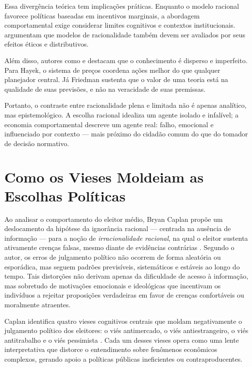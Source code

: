 Essa divergência teórica tem implicações práticas. Enquanto o modelo racional favorece políticas baseadas em incentivos marginais, a abordagem comportamental exige considerar limites cognitivos e contextos institucionais.  argumentam que modelos de racionalidade também devem ser avaliados por seus efeitos éticos e distributivos.

Além disso, autores como  e  destacam que o conhecimento é disperso e imperfeito. Para Hayek, o sistema de preços coordena ações melhor do que qualquer planejador central. Já Friedman sustenta que o valor de uma teoria está na qualidade de suas previsões, e não na veracidade de suas premissas.

Portanto, o contraste entre racionalidade plena e limitada não é apenas analítico, mas epistemológico. A escolha racional idealiza um agente isolado e infalível; a economia comportamental descreve um agente real: falho, emocional e influenciado por contexto — mais próximo do cidadão comum do que do tomador de decisão normativo.

\section{Como os Vieses Moldeiam as Escolhas Políticas} %


Ao analisar o comportamento do eleitor médio, Bryan Caplan propõe um deslocamento da hipótese da ignorância racional — centrada na ausência de informação — para a noção de \textit{irracionalidade racional}, na qual o eleitor sustenta ativamente crenças falsas, mesmo diante de evidências contrárias \cite{The_Myth_of_the_Rational_Voter}. Segundo o autor, os erros de julgamento político não ocorrem de forma aleatória ou esporádica, mas seguem padrões previsíveis, sistemáticos e estáveis ao longo do tempo. Tais distorções não derivam apenas da dificuldade de acesso à informação, mas sobretudo de motivações emocionais e ideológicas que incentivam os indivíduos a rejeitar proposições verdadeiras em favor de crenças confortáveis ou moralmente atraentes.

Caplan identifica quatro vieses cognitivos centrais que moldam negativamente o julgamento político dos eleitores: o viés antimercado, o viés antiestrangeiro, o viés antitrabalho e o viés pessimista \cite{Systematically_Biased_Beliefs_about_Economics}. Cada um desses vieses opera como uma lente interpretativa que distorce o entendimento sobre fenômenos econômicos complexos, gerando apoio a políticas públicas ineficientes ou contraproducentes.

